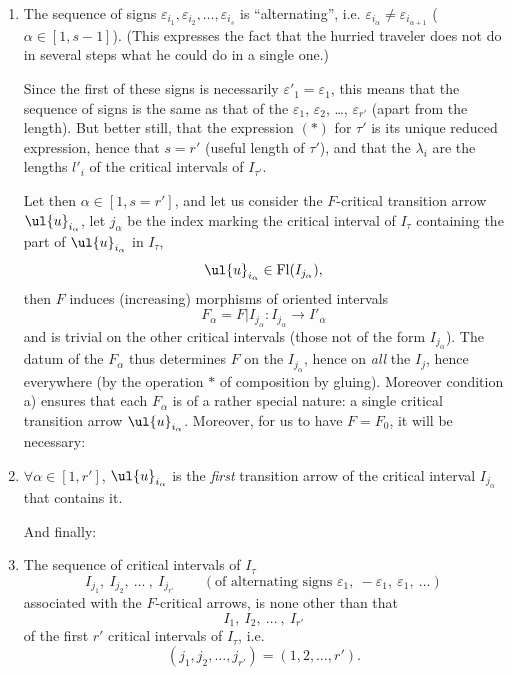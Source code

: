 \begin{enumerate}[label={}, leftmargin=*]
\item[a)] The sequence of signs $\varepsilon_{i_1},\varepsilon_{i_2},\dots,\varepsilon_{i_s}$ is ``alternating'', i.e. $\varepsilon_{i_\alpha}\neq\varepsilon_{i_{\alpha+1}}$ ($\alpha\in[1,s-1]$). (This expresses the fact that the hurried traveler does not do in several steps what he could do in a single one.)

Since the first of these signs is necessarily $\varepsilon'_1=\varepsilon_1$, this means that the sequence of signs is the same as that of the $\varepsilon_1$, $\varepsilon_2$, \dots, $\varepsilon_{r'}$ (apart from the length). But better still, that the expression $(*)$ for $\tau'$ is its unique reduced expression, hence that $s=r'$ (useful length of $\tau'$), and that the $\lambda_i$ are the lengths $l'_i$ of the critical intervals of $I_{\tau'}$.


Let then $\alpha\in[1,s=r']$, and let us consider the $F$-critical transition arrow $\ul{u}_{i_\alpha}$, let $j_\alpha$ be the index marking the critical interval of $I_\tau$ containing the part of $\ul{u}_{i_\alpha}$ in $I_\tau$,
\[
\ul{u}_{i_\alpha}\in\mathrm{Fl}(I_{j_\alpha}),
\]
then $F$ induces (increasing) morphisms of oriented intervals
\[
F_\alpha=F|I_{j_\alpha}:I_{j_\alpha}\longrightarrow I'_\alpha
\]
and is trivial on the other critical intervals (those not of the form $I_{j_\alpha}$). The datum of the $F_\alpha$ thus determines $F$ on the $I_{j_\alpha}$, hence on \textit{all} the $I_j$, hence everywhere (by the operation $*$ of composition by gluing). Moreover condition a) ensures that each $F_\alpha$ is of a rather special nature: a single critical transition arrow $\ul{u}_{i_\alpha}$. Moreover, for us to have $F=F_0$, it will be necessary:

\item[b)] $\forall\alpha\in[1,r']$, $\ul{u}_{i_\alpha}$ is the \textit{first} transition arrow of the critical interval $I_{j_\alpha}$ that contains it.

And finally:

\item[c)] The sequence of critical intervals of $I_\tau$
\[
I_{j_1},\ I_{j_2},\ \dots\ ,\ I_{j_{r'}}\qquad(\text{of alternating signs }\varepsilon_1,\ -\varepsilon_1,\ \varepsilon_1,\ \ldots)
\]
associated with the $F$-critical arrows, is none other than that
\[
I_1,\ I_2,\ \dots\ ,\ I_{r'}
\]
of the first $r'$ critical intervals of $I_\tau$, i.e.
\[
(j_1,j_2,\dots,j_{r'})=(1,2,\dots,r').
\]
\end{enumerate}

